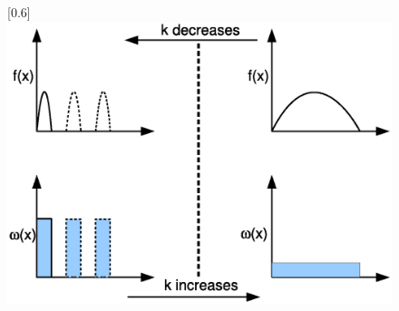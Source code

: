 \documentclass{article}
\begin{document}




\begin{figure}
\caption{\label{cutoffexplain}}
\centerline{\scalebox{0.6}[0.6]{
\includegraphics[trim=1cm 1cm 1cm 1cm]{cutoffexplain.eps}
}}
\end{figure}
\end{document}
